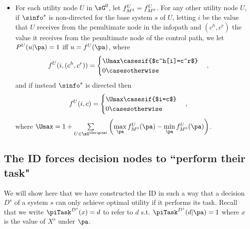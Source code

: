 \begin{definition}
\begin{itemize}
    \item For each utility node $U$ in $\sGoriginalInModelConstruction$, let $f_{M^3}^U=f^U_{M^0}$. For any other utility node $U$,
    if $\sinfo^s$ is non-directed for the base system $s$ of $U$, letting $i$ be the value that $U$ receives from the penultimate node in the infopath and $(c^h,c^r)$ the value it receives from the penultimate node of the control path, we let $P^U(u|\pa)=1$ iff $u=f^U(\pa)$, where
    \begin{align*}
    f^U(i,(c^h,c^r)) &=
        \begin{cases} 
            \Umax \casesif {$c^h[i]=c^r$}\\
            0 \casesotherwise
        \end{cases},
    \end{align*}
    and if instead $\sinfo^s$ is directed then
    \begin{align*}
    f^U(i,c) &=
        \begin{cases} 
            \Umax \casesif {$i=c$}\\
            0 \casesotherwise
        \end{cases},
    \end{align*}
    where $\Umax=1+\sum\limits_{U\in \sU^{\Goriginal}}\left(\max\limits_{\pa} f^U_{\MoriginalInModelConstruction}(\pa)-\min\limits_{\pa} f^U_{\MoriginalInModelConstruction}(\pa)\right)$.
\end{itemize}
\end{definition}



\subsection{The ID forces decision nodes to ``perform their task"} \label{sec:task-performance}

We will show here that we have constructed the ID in such a way that a decision $D^s$ of a system $s$ can only achieve optimal utility if it performs its task. Recall that we write $\piTask^{D^s}(x)=d$ to refer to $d$ s.t. $\piTask^{D^s}(d|\pa)=1$ where $x$ is the value of $X^s$ under $\pa$.


